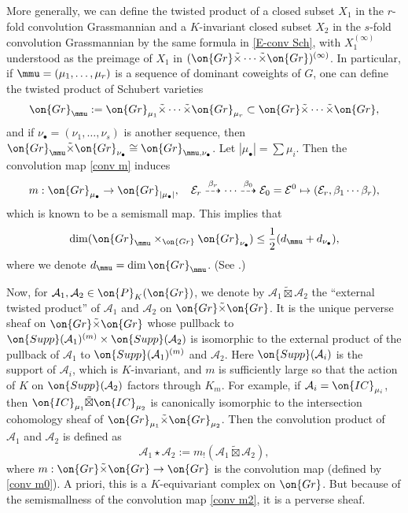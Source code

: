 \documentclass[11pt]{amsart}
\theoremstyle{definition}
\theoremstyle{definition}
\theoremstyle{definition}
\numberwithin{equation}{subsection}
\newcommand{\mA}{{\mathcal A}}
\newcommand{\mE}{{\mathcal E}}
\newcommand{\Gr}{{\on{Gr}}}
\newcommand{\IC}{\on{IC}}
\begin{document}
More generally, we can define the twisted product of a closed subset $X_1$ in the $r$-fold convolution Grassmannian and a $K$-invariant closed subset $X_2$ in the $s$-fold convolution Grassmannian by the same formula in \eqref{E-conv Sch}, with $X_1^{(\infty)}$ understood as the preimage of $X_1$ in $(\Gr\tilde\times\cdots\tilde\times\Gr)^{(\infty)}$.
In particular,  if $\mmu=(\mu_1,\ldots,\mu_r)$ is a sequence of dominant coweights of $G$, one can define the twisted product of Schubert varieties
$$\Gr_{\mmu}:=\Gr_{\mu_1}\tilde\times\cdots\tilde\times\Gr_{\mu_r}\subset\Gr\tilde\times\cdots\tilde\times\Gr,$$
and if $\nu_\bullet=(\nu_1,\ldots,\nu_s)$ is another sequence, then $\Gr_{\mmu}\tilde\times\Gr_{\nu_\bullet}\cong\Gr_{\mmu,\nu_\bullet}$.
Let $|\mu_\bullet|=\sum \mu_i$. Then the convolution map \eqref{conv m} induces
\begin{equation}\label{conv m2}
m: \Gr_{\mu_\bullet}\to \Gr_{|\mu_\bullet|}, \quad \mE_r\stackrel{\beta_r}{\dashrightarrow}\cdots\stackrel{\beta_0}{\dashrightarrow}\mE_0=\mE^0\mapsto (\mE_r,\beta_1\cdots\beta_r),
\end{equation}
which is known to be a semismall map. This implies that
\begin{equation}
\label{E:dim est}
\dim (\Gr_{\mmu}\times_\Gr\Gr_{\nu_\bullet})\leq \frac{1}{2}(d_{\mmu}+d_{\nu_\bullet}),
\end{equation}
where we denote $d_{\mmu}=\dim \Gr_{\mmu}$. (See \cite[Proposition 3.1.10]{XZ}.) 

Now, for $\mA_1,\mA_2\in \on{P}_{K}(\Gr)$,
we denote by $\mA_1\tilde\boxtimes\mA_2$ the ``external twisted product'' of $\mA_1$ and $\mA_2$ on $\Gr\tilde\times\Gr$. It is the unique perverse sheaf on $\Gr\tilde\times \Gr$ whose pullback to $\on{Supp}(\mA_1)^{(m)}\times \on{Supp}(\mA_2)$ is isomorphic to the external product of the pullback of $\mA_1$ to $\on{Supp}(\mA_1)^{(m)}$ and $\mA_2$. Here $\on{Supp}(\mA_i)$ is the support of $\mA_i$, which is $K$-invariant, and $m$ is sufficiently large so that the action of $K$ on $\on{Supp}(\mA_2)$ factors through $K_m$.
For example, if $\mA_i=\IC_{\mu_i}$, then $\IC_{\mu_1}\tilde\boxtimes\IC_{\mu_2}$ is canonically isomorphic to the intersection cohomology sheaf of $\Gr_{\mu_1}\tilde\times\Gr_{\mu_2}$.
Then the convolution product of $\mA_1$ and $\mA_2$ is defined as
\begin{equation}\label{Lus conv}
\mA_1\star\mA_2:=m_!(\mA_1\tilde\boxtimes\mA_2),
\end{equation}
where $m:\Gr\tilde\times\Gr\to \Gr$ is the convolution map (defined by \eqref{conv m0}).
A priori, this is a $K$-equivariant complex on $\Gr$. But because of the semismallness of the convolution map \eqref{conv m2}, it is a perverse sheaf.
\end{document}
